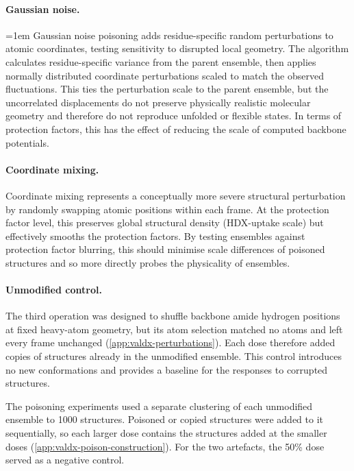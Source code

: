 \paragraph{Gaussian noise.}
{\emergencystretch=1em Gaussian noise poisoning adds residue-specific random perturbations to atomic coordinates, testing sensitivity to disrupted local geometry. The algorithm calculates residue-specific variance from the parent ensemble, then applies normally distributed coordinate perturbations scaled to match the observed fluctuations. This ties the perturbation scale to the parent ensemble, but the uncorrelated displacements do not preserve physically realistic molecular geometry and therefore do not reproduce unfolded or flexible states. In terms of protection factors, this has the effect of reducing the scale of computed backbone potentials.\par}

\paragraph{Coordinate mixing.}
Coordinate mixing represents a conceptually more severe structural perturbation by randomly swapping atomic positions within each frame. At the protection factor level, this preserves global structural density (HDX-uptake scale) but effectively smooths the protection factors. By testing ensembles against protection factor blurring, this should minimise scale differences of poisoned structures and so more directly probes the physicality of ensembles.

\paragraph{Unmodified control.}
The third operation was designed to shuffle backbone amide hydrogen positions at fixed heavy-atom geometry, but its atom selection matched no atoms and left every frame unchanged (\cref{app:valdx-perturbations}). Each dose therefore added copies of structures already in the unmodified ensemble. This control introduces no new conformations and provides a baseline for the responses to corrupted structures.

The poisoning experiments used a separate clustering of each unmodified ensemble to 1000 structures. Poisoned or copied structures were added to it sequentially, so each larger dose contains the structures added at the smaller doses (\cref{app:valdx-poison-construction}). For the two artefacts, the 50\% dose served as a negative control.

